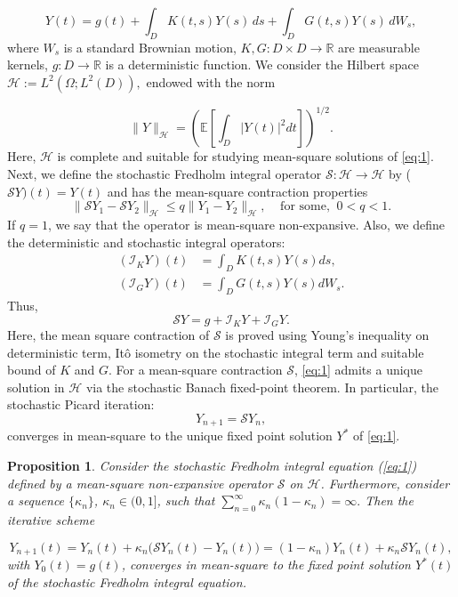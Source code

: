 \documentclass[preprint,12pt,authoryear]{elsarticle}
\newtheorem{proposition}{Proposition}
\begin{document}
\begin{equation}
	Y(t) = g(t) + \int_D K(t,s) Y(s)\, ds 
	+ \int_D G(t,s) Y(s)\, dW_s, \label{eq:1}
\end{equation}
\noindent where $W_s$ is a standard Brownian motion, $K,G : D\times D \to \mathbb{R}$ are measurable kernels,
$g : D \to \mathbb{R}$ is a deterministic function.
We consider the Hilbert space $
\mathcal{H} := L^2(\Omega; L^2(D)),
$ endowed with the norm

\[
\|Y\|_{\mathcal{H}} 
=
\left(
\mathbb{E}\left[\int_D |Y(t)|^2 dt\right]
\right)^{1/2}.
\]
Here, $\mathcal{H}$ is complete and suitable for studying mean-square solutions of \eqref{eq:1}.
Next, we define the stochastic Fredholm integral operator $\mathcal{S} : \mathcal{H} \to \mathcal{H}$ by ($\mathcal{S}Y)(t)=Y(t)$ and has the mean-square contraction properties
\begin{equation}
	\|\mathcal{S}Y_1 - \mathcal{S}Y_2\|_{\mathcal{H}}
	\le q \|Y_1 - Y_2\|_{\mathcal{H}},\;\;\;\; \text{for some,}\;\; 0 < q < 1.  
	\label{eq:2}
\end{equation}
\noindent If $q = 1$, we say that the operator is mean-square non-expansive. Also, we define the deterministic and stochastic integral operators:
\begin{align}
	(\mathcal{I}_K Y)(t) &= \int_D K(t,s) Y(s) ds, \label{eq:3} \\
	(\mathcal{I}_G Y)(t) &= \int_D G(t,s) Y(s) dW_s. \label{eq:4}
\end{align}
Thus,
\[
\mathcal{S}Y = g + \mathcal{I}_K Y + \mathcal{I}_G Y.
\]
Here, the mean square contraction of $\mathcal{S}$ is proved using Young's inequality on deterministic term, Itô isometry on the stochastic integral term and suitable bound of $K$ and $G$.  For a mean-square contraction $\mathcal{S}$, \eqref{eq:1} admits a unique solution in $\mathcal{H}$ 
via the stochastic Banach fixed-point theorem. In particular, the stochastic Picard iteration:
\begin{equation}
	Y_{n+1} = \mathcal{S} Y_n,
	\label{eq:5}
\end{equation}
converges in mean-square to the unique fixed point solution $Y^\ast$ of \eqref{eq:1}. \\
\begin{proposition}\cite{Protter2005}
Consider the stochastic Fredholm integral equation (\eqref{eq:1}) defined by a 
mean-square non-expansive operator $\mathcal{S}$ on $\mathcal{H}$. 
Furthermore, consider a sequence $\{\kappa_n\}$, $\kappa_n \in (0,1]$, 
such that $
\sum_{n=0}^{\infty} \kappa_n (1-\kappa_n) = \infty.$ Then the iterative scheme

\begin{equation}
	Y_{n+1}(t)
	=
	Y_n(t)
	+
	\kappa_n \big( \mathcal{S}Y_n(t) - Y_n(t) \big)
	=
	(1-\kappa_n) Y_n(t)
	+
	\kappa_n \mathcal{S}Y_n(t),
	\label{eq:7}
\end{equation}
\noindent with $Y_0(t) = g(t)$, converges in mean-square to the fixed point solution 
$Y^\ast(t)$ of the stochastic Fredholm integral equation.	
\end{proposition}
\end{document}
